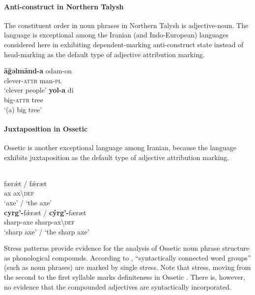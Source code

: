 \paragraph*{Anti\hyp{}construct in Northern Talysh}
\label{talysh synchr}
The constituent order in noun phrases in Northern Talysh is adjective-noun. The language is exceptional among the Iranian (and Indo-European) languages considered here in exhibiting dependent\hyp{}marking anti\hyp{}construct state instead of head-marking  as the default type of adjective attribution marking.
\begin{exe}
\begin{xlist}
\ex
\gll	\textbf{āğəlmānd-a} odam-on\\
	clever-\textsc{attr} man-\textsc{pl}\\
\glt	‘clever people’
\ex
\gll	\textbf{yol-a} di\\
	big-\textsc{attr} tree\\
\glt	‘(a) big tree’
\end{xlist}
\end{exe}

\paragraph*{Juxtaposition in Ossetic}
Ossetic is another exceptional language among Iranian, because the language exhibits juxtaposition as the default type of adjective attribution marking.
\begin{exe}
\label{ossetic attrcomp}
\begin{xlist}
\\
\gll	færǽt / fǽræt\\
	ax { } ax\textbackslash\textsc{def}\\
\glt	‘axe’ / ‘the axe’
\\
\gll	\textbf{cyrg'-}fǽræt / \textbf{cýrg'-}færæt\\
	sharp-axe { } sharp-ax\textbackslash\textsc{def}\\
\glt	‘sharp axe’ / ‘the sharp axe’
\end{xlist}
\end{exe}
Stress patterns provide evidence for the analysis of Ossetic noun phrase structure as phonological compounds. According to \citet[10]{abaev1964}, “syntactically connected word groups” (such as noun phrases) are marked by single stress. Note that stress, moving from the second to the first syllable marks definiteness in Ossetic \citep[12]{abaev1964}. There is, however, no evidence that the compounded adjectives are syntactically incorporated.

